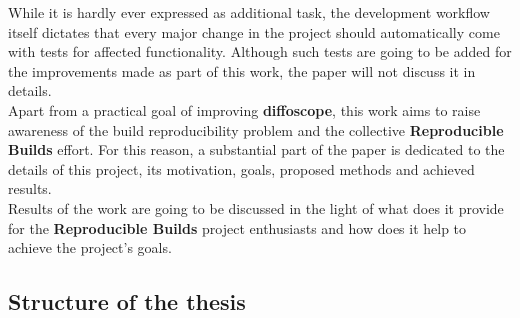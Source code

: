 {While it is hardly ever expressed as additional task, the development workflow
itself dictates that every major change in the project should automatically come 
with tests for affected functionality. Although such tests are going to be added
for the improvements made as part of this work, the paper will not discuss it in 
details.\\
Apart from a practical goal of improving \textbf{diffoscope}, this work aims
to raise awareness of the build reproducibility problem and the collective
\textbf{Reproducible Builds} effort. For this reason, a substantial part of
the paper is dedicated to the details of this project, its motivation, goals,
proposed methods and achieved results.\\
Results of the work are going to be discussed in the light of what does it
provide for the \textbf{Reproducible Builds} project enthusiasts and how does
it help to achieve the project's goals.
}

\subsection[Structure of the thesis]{Structure of the thesis}



\cleardoublepage
